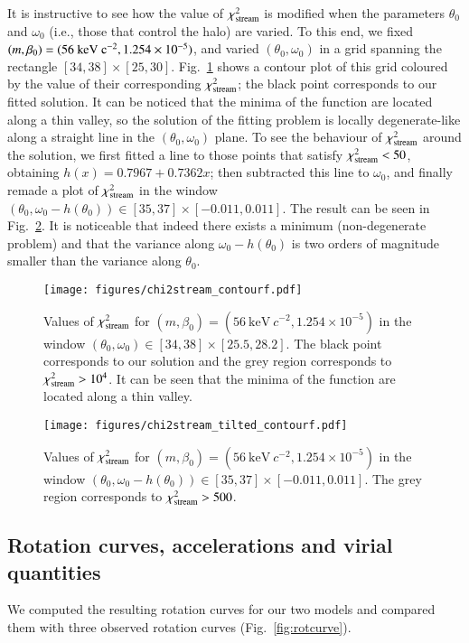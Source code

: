 \documentclass[twocolumn]{aa}
\begin{document}
It is instructive to see how the value of $\chi^2_{\rm{stream}}$ is modified when the parameters $\theta_0$ and $\omega_0$ (i.e., those that control the halo) are varied. To this end, we fixed $(m, \beta_0)=(56~\rm{keV}~c^{-2}, 1.254\times10^{-5})$, and varied $(\theta_0, \omega_0)$ in a grid spanning the rectangle $[34, 38]\times[25, 30]$.
Fig.~\ref{fig:chi2stream} shows a contour plot of this grid coloured by the value of their corresponding $\chi^2_{\rm{stream}}$; the black point corresponds to our fitted solution.
It can be noticed that the minima of the function are located along a thin valley, so the solution of the fitting problem is locally degenerate-like along a straight line in the $(\theta_0, \omega_0)$ plane.
To see the behaviour of $\chi^2_{\rm{stream}}$ around the solution, we first fitted a line to those points that satisfy $\chi^2_{\rm{stream}}<50$,
obtaining $h(x)= 0.7967+0.7362x$; then subtracted this line to $\omega_0$, and finally remade a plot of $\chi^2_{\rm{stream}}$ in the window $(\theta_0, \omega_0-h(\theta_0))\in[35, 37]\times[-0.011,0.011]$. The result can be seen in Fig.~\ref{fig:chi2stream_tilted}. It is noticeable that indeed there exists a minimum (non-degenerate problem) and that
the variance along $\omega_0-h(\theta_0)$ is two orders of magnitude smaller than the variance along $\theta_0$.
%
\begin{figure}
   \centering
   \texttt{[image: figures/chi2stream\_contourf.pdf]}
   \caption{Values of $\chi^2_{\rm{stream}}$ for $(m, \beta_0)=(56~\mathrm{keV}~c^{-2}, 1.254\times10^{-5})$ in the window $(\theta_0, \omega_0)\in[34, 38]\times[25.5,28.2]$. The black point corresponds to our solution and the grey region corresponds to $\chi^2_{\rm{stream}} >10^4$. It can be seen that the minima of the function are located along a thin valley.}
   \label{fig:chi2stream}
\end{figure}
\begin{figure}
   \centering
   \texttt{[image: figures/chi2stream\_tilted\_contourf.pdf]}
   \caption{Values of $\chi^2_{\rm{stream}}$ for $(m, \beta_0)=(56~\mathrm{keV}~c^{-2}, 1.254\times10^{-5})$ in
   the window $(\theta_0, \omega_0-h(\theta_0))\in[35, 37]\times[-0.011,0.011]$. The grey region corresponds to $\chi^2_{\rm{stream}} > 500 $. }
   \label{fig:chi2stream_tilted}
\end{figure}

\subsection{Rotation curves, accelerations and virial quantities}
We computed the resulting rotation curves for our two models and compared them with three observed rotation curves (Fig.~\ref{fig:rotcurve}).
\end{document}
